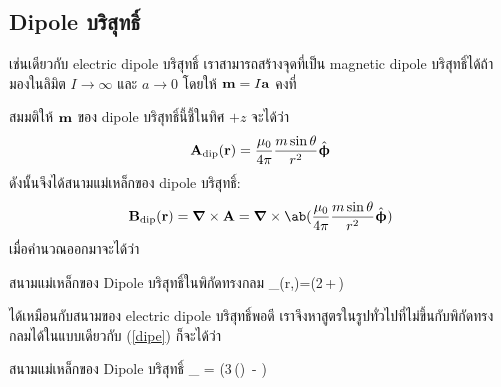 \subsection{Dipole บริสุทธิ์}
เช่นเดียวกับ electric dipole บริสุทธิ์ เราสามารถสร้างจุดที่เป็น magnetic dipole บริสุทธิ์ได้ถ้ามองในลิมิต $I\to\infty$ และ $a\to 0$ โดยให้ $\mathbf{m} = I\mathbf{a}$ คงที่

สมมติให้ $\mathbf{m}$ ของ dipole บริสุทธิ์นี้ชี้ในทิศ $+z$ จะได้ว่า
\[
\mathbf{A}_{\mathrm{dip}}(\mathbf{r}) = \frac{\mu_0}{4\pi}\frac{m\sin\theta}{r^2}\hat{\boldsymbol{\upphi}}
\]
ดังนั้นจึงได้สนามแม่เหล็กของ dipole บริสุทธิ์:
\[
\vb{B}_\txt{dip}(\vb{r}) = \gd\times\vb{A} = \gd\times\ab(\frac{\mu_0}{4\pi}\frac{m\sin\theta}{r^2}\vus{\upphi})
\]
เมื่อคำนวณออกมาจะได้ว่า
\begin{eqbox}{สนามแม่เหล็กของ Dipole บริสุทธิ์ในพิกัดทรงกลม}
    _(r,\theta)=\ab(2\cos\theta\,+\sin\theta\,\vus{\uptheta})
\end{eqbox}
ได้เหมือนกับสนามของ electric dipole บริสุทธิ์พอดี เราจึงหาสูตรในรูปทั่วไปที่ไม่ขึ้นกับพิกัดทรงกลมได้ในแบบเดียวกับ (\ref{dipe}) ก็จะได้ว่า
\begin{eqbox}{สนามแม่เหล็กของ Dipole บริสุทธิ์}
    _ = \ab\Big(3\,\ab(\cdot{})\, - )
\end{eqbox}